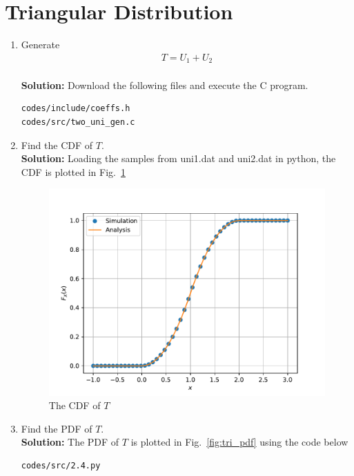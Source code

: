 \documentclass[journal,10pt,twocolumn]{article}
\newcommand\figref{Fig.~\ref}
\newcommand{\solution}{\noindent \textbf{Solution: }}
\begin{document}
\section{Triangular Distribution}
%
\begin{enumerate}
\item Generate 
	\begin{align}
		T = U_1+U_2
	\end{align}\\
\solution Download the following files and execute the  C program.
\begin{lstlisting}
codes/include/coeffs.h
codes/src/two_uni_gen.c
\end{lstlisting}
\item Find the CDF of $T$.\\
\solution Loading the samples from uni1.dat and uni2.dat in python, the CDF is plotted in \figref{fig:tri_cdf} 
\begin{figure}[h]
\centering
\includegraphics[width=\columnwidth]{./chapters/ch2/figs/tri_cdf.pdf}
\caption{The CDF of $T$}
\label{fig:tri_cdf}
\end{figure}
\item Find the PDF of $T$.\\
\solution The PDF of $T$ is plotted in \figref{fig:tri_pdf} using the code below
\begin{lstlisting}
codes/src/2.4.py
\end{lstlisting}
\begin{figure}[h]
\centering

\end{figure}
\end{enumerate}
\end{document}
